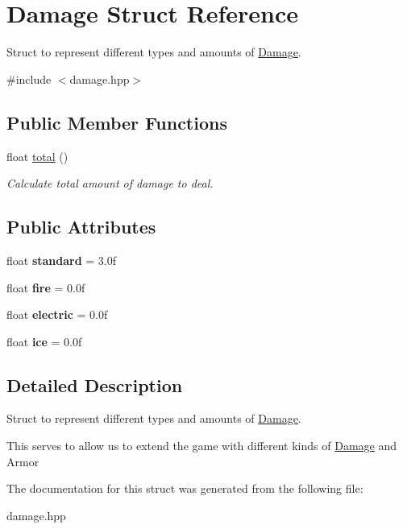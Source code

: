 \hypertarget{struct_damage}{}\section{Damage Struct Reference}
\label{struct_damage}


Struct to represent different types and amounts of \mbox{\hyperlink{struct_damage}{Damage}}.  




{\ttfamily \#include $<$damage.\+hpp$>$}

\subsection*{Public Member Functions}
\begin{DoxyCompactItemize}
\item 
\mbox{\label{struct_damage_a11408c478cd3078ec3d2c390a8aaae82}} 
float \mbox{\hyperlink{struct_damage_a11408c478cd3078ec3d2c390a8aaae82}{total}} ()
\begin{DoxyCompactList}\small\item\em Calculate total amount of damage to deal. \end{DoxyCompactList}\end{DoxyCompactItemize}
\subsection*{Public Attributes}
\begin{DoxyCompactItemize}
\item 
\mbox{\label{struct_damage_abda13a8a1037471cbb2f25d8fa011c78}} 
float {\bfseries standard} = 3.\+0f
\item 
\mbox{\label{struct_damage_a9b030054c5136f3c915ff6816759a80e}} 
float {\bfseries fire} = 0.\+0f
\item 
\mbox{\label{struct_damage_a7c079a8498aff26eb6e3571c4fc50290}} 
float {\bfseries electric} = 0.\+0f
\item 
\mbox{\label{struct_damage_a2851de042eb5c66465abc752c83f519d}} 
float {\bfseries ice} = 0.\+0f
\end{DoxyCompactItemize}


\subsection{Detailed Description}
Struct to represent different types and amounts of \mbox{\hyperlink{struct_damage}{Damage}}. 

This serves to allow us to extend the game with different kinds of \mbox{\hyperlink{struct_damage}{Damage}} and Armor 

The documentation for this struct was generated from the following file\+:\begin{DoxyCompactItemize}
\item 
damage.\+hpp\end{DoxyCompactItemize}
